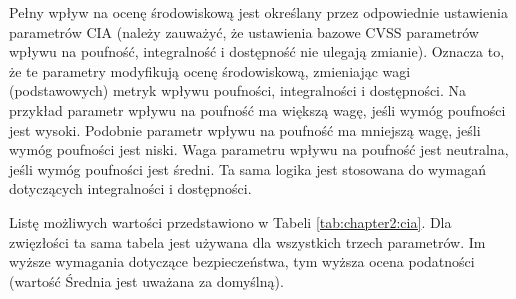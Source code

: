 \bigbreak
Pełny wpływ na ocenę środowiskową jest określany przez odpowiednie ustawienia parametrów CIA (należy zauważyć, że ustawienia bazowe CVSS parametrów wpływu na poufność, integralność i dostępność nie ulegają zmianie). Oznacza to, że te parametry modyfikują ocenę środowiskową, zmieniając wagi (podstawowych) metryk wpływu poufności, integralności i dostępności. Na przykład parametr wpływu na poufność ma większą wagę, jeśli wymóg poufności jest wysoki. Podobnie parametr wpływu na poufność ma mniejszą wagę, jeśli wymóg poufności jest niski. Waga parametru wpływu na poufność jest neutralna, jeśli wymóg poufności jest średni. Ta sama logika jest stosowana do wymagań dotyczących integralności i dostępności.

\bigbreak
Listę możliwych wartości przedstawiono w Tabeli \ref{tab:chapter2:cia}. Dla zwięzłości ta sama tabela jest używana dla wszystkich trzech parametrów. Im wyższe wymagania dotyczące bezpieczeństwa, tym wyższa ocena podatności (wartość Średnia jest uważana za domyślną).

